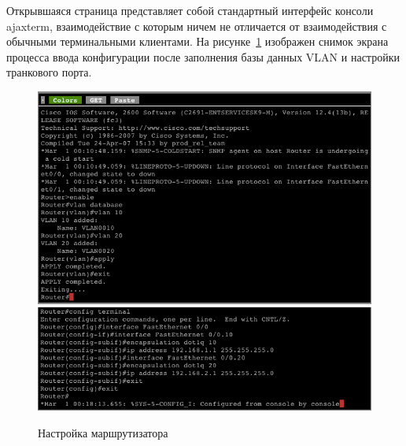 Открывшаяся страница представляет собой стандартный интерфейс консоли ajaxterm, взаимодействие с которым ничем не отличается
от взаимодействия с обычными терминальными клиентами. На рисунке~\ref{fig:example-router-setup} изображен снимок экрана
процесса ввода конфигурации после заполнения базы данных VLAN и настройки транкового порта.
\begin{figure}
  \centering
  \includegraphics[width=14cm]{fig/example-router-setup-1.png}
  \includegraphics[width=14cm]{fig/example-router-setup-2.png}
  \caption{Настройка маршрутизатора}
  \label{fig:example-router-setup}
\end{figure}

